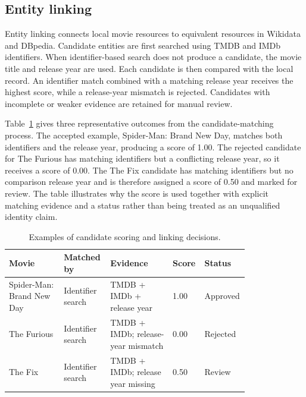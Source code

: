\subsection{Entity linking}

Entity linking connects local movie resources to equivalent resources in
Wikidata and DBpedia. Candidate entities are first searched using TMDB and
IMDb identifiers. When identifier-based search does not produce a candidate,
the movie title and release year are used. Each candidate is then compared
with the local record. An identifier match combined with a matching release
year receives the highest score, while a release-year mismatch is rejected.
Candidates with incomplete or weaker evidence are retained for manual review.

Table~\ref{tab:linking-scores} gives three representative outcomes from the
candidate-matching process. The accepted example, Spider-Man: Brand New
Day, matches both identifiers and the release year, producing a score of
1.00. The rejected candidate for The Furious has matching identifiers but
a conflicting release year, so it receives a score of 0.00. The The Fix
candidate has matching identifiers but no comparison release year and is
therefore assigned a score of 0.50 and marked for review. The table
illustrates why the score is used together with explicit matching evidence
and a status rather than being treated as an unqualified identity claim.

\begin{table}[t]
    \centering
    \caption{Examples of candidate scoring and linking decisions.}
    \label{tab:linking-scores}
    \small
    \begin{tabular}{p{0.22\linewidth}p{0.16\linewidth}p{0.25\linewidth}p{0.08\linewidth}p{0.09\linewidth}}
        \toprule
        \textbf{Movie} & \textbf{Matched by} & \textbf{Evidence} &
        \textbf{Score} & \textbf{Status} \\
        \midrule
        Spider-Man: Brand New Day &
        Identifier search &
        TMDB + IMDb + release year &
        1.00 & Approved \\
        The Furious &
        Identifier search &
        TMDB + IMDb; release-year mismatch &
        0.00 & Rejected \\
        The Fix &
        Identifier search &
        TMDB + IMDb; release year missing &
        0.50 & Review \\
        \bottomrule
    \end{tabular}
\end{table}

